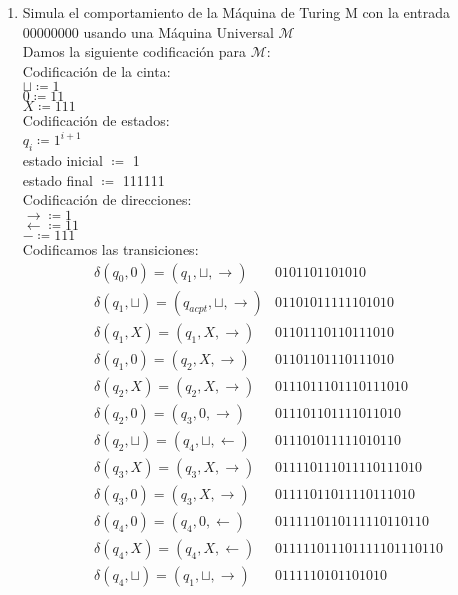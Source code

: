\documentclass{article}
\begin{document}
\begin{enumerate}
{\begin{enumerate}
{        	\begin{figure} [H]
        		\centering
        		\texttt{[image: MaquinaTuring1.png]}
        		\caption{Diagrama de la Máquina M}
        	\end{figure}
        }
    	\item {
    	Simula el comportamiento de la Máquina de Turing M con la entrada 00000000 usando una Máquina Universal $\mathcal{M}$\\
    	
    	Damos la siguiente codificación para $\mathcal{M}$:\\
    	
    	Codificación de la cinta:\\
    	$\sqcup \coloneqq 1$\\
    	$0 \coloneqq 11$\\
    	$X \coloneqq 111$\\
    	
    	Codificación de estados:\\
    	$q_i \coloneqq 1 ^{i + 1}$\\
    	estado inicial $\coloneqq$ 1\\
    	estado final $\coloneqq$ 111111\\
    	
    	Codificación de direcciones:\\
    	$\rightarrow \coloneqq 1$\\
    	$\leftarrow \coloneqq 11$\\
    	$- \coloneqq 111$\\
    	
    	Codificamos las transiciones:\\
    	\begin{align*}
    	&\delta(q_0, 0) = (q_1, \sqcup, \rightarrow)
    	&0101101101010\\
    	&\delta(q_1, \sqcup) = (q_{acpt}, \sqcup, \rightarrow)
    	&01101011111101010\\
    	&\delta(q_1, X) = (q_{1}, X, \rightarrow)
    	&01101110110111010\\
    	&\delta(q_1, 0) = (q_2, X, \rightarrow)
    	&01101101110111010\\
    	&\delta(q_2, X) = (q_2, X, \rightarrow)
    	&0111011101110111010\\
    	&\delta(q_2, 0) = (q_3, 0, \rightarrow)
    	&011101101111011010\\
    	&\delta(q_2, \sqcup) = (q_4, \sqcup, \leftarrow)
    	&011101011111010110\\
    	&\delta(q_3, X) = (q_3, X, \rightarrow)
    	&011110111011110111010\\
    	&\delta(q_3, 0) = (q_3, X, \rightarrow)
    	&01111011011110111010\\
    	&\delta(q_4, 0) = (q_4, 0, \leftarrow)
    	&0111110110111110110110\\
    	&\delta(q_4, X) = (q_4, X, \leftarrow)
    	&011111011101111101110110\\
    	&\delta(q_4, \sqcup) = (q_1, \sqcup, \rightarrow)
    	&0111110101101010
    	\end{align*}
    	
}
\end{enumerate}}
\end{enumerate}
\end{document}
